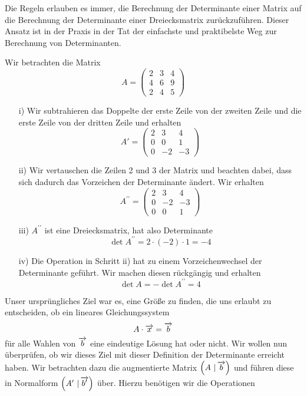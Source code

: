 
\bigbreak

\begin{notiz} Die Regeln erlauben es immer, die Berechnung der Determinante einer Matrix auf die Berechnung der 
Determinante einer Dreiecksmatrix zurückzuführen. Dieser Ansatz ist in der Praxis in der Tat der einfachste 
und praktibelste Weg zur Berechnung von Determinanten.
\end{notiz}

\begin{beispiel} Wir betrachten die Matrix 
  	$$ A = \left( \begin{matrix} 2 & 3 & 4 \\  4 & 6 & 9 \\ 2 & 4 & 5 \end{matrix} \right) $$

\begin{itemize}
\item[i)] Wir subtrahieren das Doppelte der erste Zeile von der zweiten Zeile und die erste Zeile von der 
dritten Zeile und erhalten
  	$$ A' = \left( \begin{matrix} 2 & 3 & 4 \\  0 & 0 & 1 \\ 0 & -2 & -3 \end{matrix} \right) $$
\item[ii)] Wir vertauschen die Zeilen 2 und 3 der Matrix und beachten dabei, dass sich dadurch das Vorzeichen 
der Determinante ändert. Wir erhalten
  	$$ A^{\prime \prime} = \left( \begin{matrix} 2 & 3 & 4 \\ 0 & -2 & -3 \\  0 & 0 & 1 \end{matrix} \right) $$
\item[iii)] $A^{\prime \prime}$ ist eine Dreiecksmatrix, hat also Determinante
  	$$ \det{A^{\prime \prime}} = 2 \cdot (-2) \cdot 1 = -4 $$
\item[iv)] Die Operation in Schritt ii) hat zu einem Vorzeichenwechsel der Determinante geführt. Wir machen 
diesen rückgängig und erhalten
  	$$ \det{A} = - \det{A^{\prime \prime}} =  4 $$
\end{itemize}
\end{beispiel}

\bigbreak

Unser ursprüngliches Ziel war es, eine Größe zu finden, die uns erlaubt zu entscheiden, ob ein 
lineares Gleichungssystem 
  	$$ A \cdot \overrightarrow{x} = \overrightarrow{b} $$
für alle Wahlen von $\overrightarrow{b}$ eine eindeutige Lösung hat oder nicht. Wir wollen nun 
überprüfen, ob wir dieses Ziel mit dieser Definition der Determinante erreicht haben. Wir betrachten 
dazu die augmentierte Matrix $\left( A \,\, \vert \, \overrightarrow{b} \right)$ und führen diese in Normalform 
$\left( A' \,\, \vert \, \overrightarrow{b'} \right)$ über. Hierzu benötigen wir die Operationen

